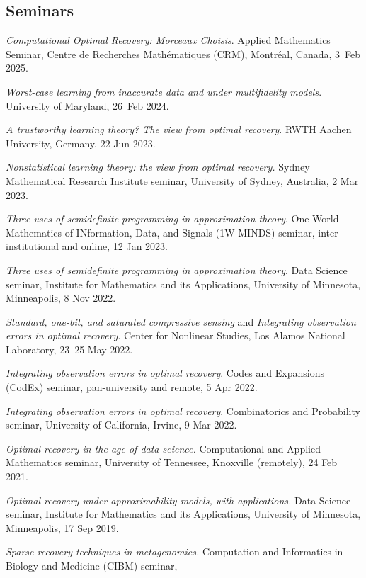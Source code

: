 \documentclass[11pt]{article}
\begin{document}
\subsection{Seminars}
\bitemize
\item {\sl Computational Optimal Recovery: Morceaux Choisis}. Applied Mathematics Seminar,
Centre de Recherches Math\'ematiques (CRM), Montr\'eal, Canada, 3~Feb 2025.
\item {\sl Worst-case learning from inaccurate data and under multifidelity models}.
University of Maryland, 26~Feb 2024.
\item {\sl A trustworthy learning theory? The view from optimal recovery}.
RWTH Aachen University, Germany, 22 Jun 2023.
\item {\sl Nonstatistical learning theory: the view from optimal recovery.}
Sydney Mathematical Research Institute seminar,
University of Sydney, Australia, 2 Mar 2023.
\item {\sl Three uses of semidefinite programming in approximation theory}.
One World Mathematics of INformation, Data, and Signals (1W-MINDS) seminar,
inter-institutional and online, 12 Jan 2023.
\item {\sl Three uses of semidefinite programming in approximation theory}.
 Data Science seminar,
 Institute for Mathematics and its Applications,
 University of Minnesota, Minneapolis, 8 Nov 2022.
\item {\sl Standard,  one-bit, and saturated compressive sensing} and {\sl Integrating observation errors in optimal recovery}.
Center for Nonlinear Studies, Los Alamos National Laboratory, 23--25 May 2022.
\item {\sl Integrating observation errors in optimal recovery}.  Codes and Expansions (CodEx) seminar,
pan-university and remote, 5 Apr 2022.
\item {\sl Integrating observation errors in optimal recovery}.
Combinatorics and Probability seminar, 
University of California, Irvine, 9 Mar 2022.
\item {\sl Optimal recovery in the age of data science.}
Computational and Applied Mathematics seminar,
University of Tennessee, Knoxville (remotely), 24 Feb 2021.
\item {\sl Optimal recovery under approximability models, with applications.}
 Data Science seminar,
 Institute for Mathematics and its Applications,
 University of Minnesota, Minneapolis, 17 Sep 2019.
\item {\sl Sparse recovery techniques in metagenomics.}
Computation and Informatics in Biology and Medicine (CIBM) seminar,
\end{document}

